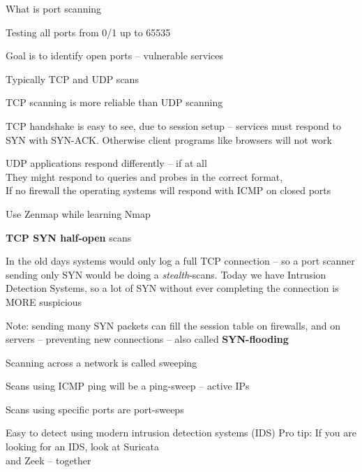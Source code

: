 \documentclass[Screen16to9,17pt]{foils}
\begin{document}

\begin{list1}
\item What is port scanning
\item Testing all ports from 0/1 up to 65535
\item Goal is to identify open ports -- vulnerable services
\item Typically TCP and UDP scans
\item TCP scanning is more reliable than UDP scanning
\item TCP handshake is easy to see, due to session setup -- services must respond to SYN with SYN-ACK. Otherwise client programs like browsers will not work
\item UDP applications respond differently -- if at all\\
They might respond to queries and probes in the correct format, \\
If no firewall the operating systems will respond with ICMP on closed ports
\item Use Zenmap while learning Nmap
\end{list1}




\begin{list2}
\item {\bfseries TCP SYN half-open} scans
\item In the old days systems would only log a full TCP connection
  -- so a port scanner sending only SYN would be doing a \emph{stealth}-scans. Today we have Intrusion Detection Systems, so a lot of SYN without ever completing the connection is MORE suspicious
\item Note: sending many SYN packets can fill the session table on firewalls, and on servers -- preventing new connections -- also called {\bfseries SYN-flooding}
\end{list2}



\begin{list1}
\item Scanning across a network is called sweeping
\item Scans using ICMP ping will be a ping-sweep -- active IPs
\item Scans using specific ports are port-sweeps
\item Easy to detect using modern intrusion detection systems (IDS)
\vskip 2cm
Pro tip: If you are looking for an IDS, look at Suricata \\
and Zeek  -- together
\end{list1}
\end{document}

